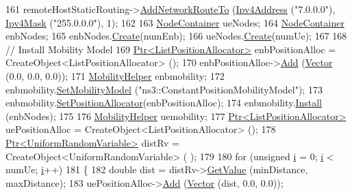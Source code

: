 \begin{DoxyCode}
161         remoteHostStaticRouting->\hyperlink{classns3_1_1Ipv4StaticRouting_a8bf5eaa7ba49fe33c78c70d5560b6c39}{AddNetworkRouteTo} (\hyperlink{classns3_1_1Ipv4Address}{Ipv4Address} (\textcolor{stringliteral}{"7.0.0.0"}), 
      \hyperlink{classns3_1_1Ipv4Mask}{Ipv4Mask} (\textcolor{stringliteral}{"255.0.0.0"}), 1);
162 
163         \hyperlink{classns3_1_1NodeContainer}{NodeContainer} ueNodes;
164         \hyperlink{classns3_1_1NodeContainer}{NodeContainer} enbNodes;
165         enbNodes.\hyperlink{classns3_1_1NodeContainer_a787f059e2813e8b951cc6914d11dfe69}{Create}(numEnb);
166         ueNodes.\hyperlink{classns3_1_1NodeContainer_a787f059e2813e8b951cc6914d11dfe69}{Create}(numUe);
167 
168         \textcolor{comment}{// Install Mobility Model}
169         \hyperlink{classns3_1_1Ptr}{Ptr<ListPositionAllocator>} enbPositionAlloc = 
      CreateObject<ListPositionAllocator> ();
170         enbPositionAlloc->\hyperlink{classns3_1_1ListPositionAllocator_a460e82f015ac012a73ba0ea0cccb3486}{Add} (\hyperlink{classns3_1_1Vector3D_a7e59b47bc94c9cb1dadff68c1d0112d8}{Vector} (0.0, 0.0, 0.0));
171         \hyperlink{classns3_1_1MobilityHelper}{MobilityHelper} enbmobility;
172         enbmobility.\hyperlink{classns3_1_1MobilityHelper_a030275011b6f40682e70534d30280aba}{SetMobilityModel} (\textcolor{stringliteral}{"ns3::ConstantPositionMobilityModel"});
173         enbmobility.\hyperlink{classns3_1_1MobilityHelper_ac59d5295076be3cc11021566713a28c5}{SetPositionAllocator}(enbPositionAlloc);
174         enbmobility.\hyperlink{classns3_1_1MobilityHelper_a07737960ee95c0777109cf2994dd97ae}{Install} (enbNodes);
175 
176         \hyperlink{classns3_1_1MobilityHelper}{MobilityHelper} uemobility;
177         \hyperlink{classns3_1_1Ptr}{Ptr<ListPositionAllocator>} uePositionAlloc = 
      CreateObject<ListPositionAllocator> ();
178         \hyperlink{classns3_1_1Ptr}{Ptr<UniformRandomVariable>} distRv = CreateObject<UniformRandomVariable> (
      );
179 
180         \textcolor{keywordflow}{for} (\textcolor{keywordtype}{unsigned} \hyperlink{bernuolliDistribution_8m_a6f6ccfcf58b31cb6412107d9d5281426}{i} = 0; \hyperlink{bernuolliDistribution_8m_a6f6ccfcf58b31cb6412107d9d5281426}{i} < numUe; \hyperlink{bernuolliDistribution_8m_a6f6ccfcf58b31cb6412107d9d5281426}{i}++)
181         \{
182                 \textcolor{keywordtype}{double} dist = distRv->\hyperlink{classns3_1_1UniformRandomVariable_a03822d8c86ac51e9aa83bbc73041386b}{GetValue} (minDistance, maxDistance);
183                 uePositionAlloc->\hyperlink{classns3_1_1ListPositionAllocator_a460e82f015ac012a73ba0ea0cccb3486}{Add} (\hyperlink{classns3_1_1Vector3D_a7e59b47bc94c9cb1dadff68c1d0112d8}{Vector} (dist, 0.0, 0.0));

\end{DoxyCode}
